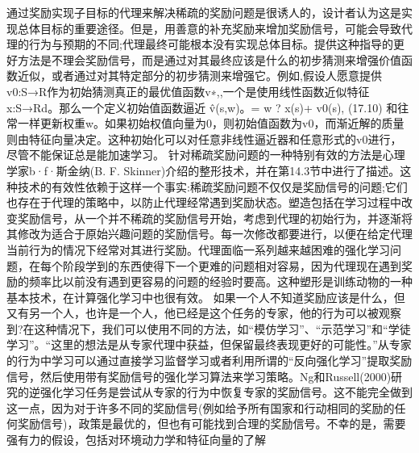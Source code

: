 通过奖励实现子目标的代理来解决稀疏的奖励问题是很诱人的，设计者认为这是实现总体目标的重要途径。但是，用善意的补充奖励来增加奖励信号，可能会导致代理的行为与预期的不同;代理最终可能根本没有实现总体目标。提供这种指导的更好方法是不理会奖励信号，而是通过对其最终应该是什么的初步猜测来增强价值函数近似，或者通过对其特定部分的初步猜测来增强它。例如,假设人愿意提供v0:S→R作为初始猜测真正的最优值函数v∗,,一个是使用线性函数近似特征x:S→Rd。那么一个定义初始值函数逼近
v̂(s,w)。= w ? x(s)+ v0(s), 					(17.10)
和往常一样更新权重w。如果初始权值向量为0，则初始值函数为v0，而渐近解的质量则由特征向量决定。这种初始化可以对任意非线性逼近器和任意形式的v0进行，尽管不能保证总是能加速学习。
针对稀疏奖励问题的一种特别有效的方法是心理学家b·f·斯金纳(B. F. Skinner)介绍的整形技术，并在第14.3节中进行了描述。这种技术的有效性依赖于这样一个事实:稀疏奖励问题不仅仅是奖励信号的问题;它们也存在于代理的策略中，以防止代理经常遇到奖励状态。塑造包括在学习过程中改变奖励信号，从一个并不稀疏的奖励信号开始，考虑到代理的初始行为，并逐渐将其修改为适合于原始兴趣问题的奖励信号。每一次修改都要进行，以便在给定代理当前行为的情况下经常对其进行奖励。代理面临一系列越来越困难的强化学习问题，在每个阶段学到的东西使得下一个更难的问题相对容易，因为代理现在遇到奖励的频率比以前没有遇到更容易的问题的经验时要高。这种塑形是训练动物的一种基本技术，在计算强化学习中也很有效。
如果一个人不知道奖励应该是什么，但又有另一个人，也许是一个人，他已经是这个任务的专家，他的行为可以被观察到?在这种情况下，我们可以使用不同的方法，如“模仿学习”、“示范学习”和“学徒学习”。“这里的想法是从专家代理中获益，但保留最终表现更好的可能性。”从专家的行为中学习可以通过直接学习监督学习或者利用所谓的“反向强化学习”提取奖励信号，然后使用带有奖励信号的强化学习算法来学习策略。Ng和Russell(2000)研究的逆强化学习任务是尝试从专家的行为中恢复专家的奖励信号。这不能完全做到这一点，因为对于许多不同的奖励信号(例如给予所有国家和行动相同的奖励的任何奖励信号)，政策是最优的，但也有可能找到合理的奖励信号。不幸的是，需要强有力的假设，包括对环境动力学和特征向量的了解

